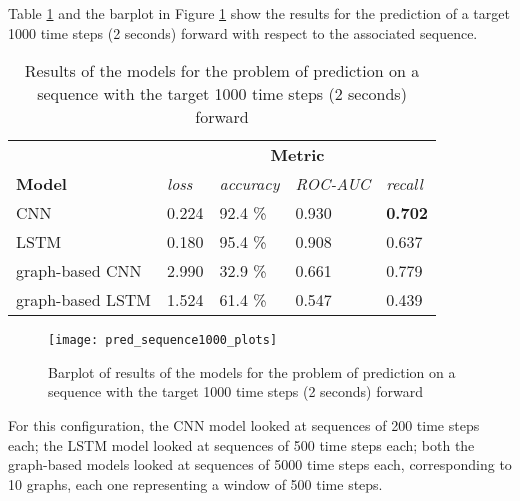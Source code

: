 Table \ref{tab:pred_sequence1000_results} and the barplot in Figure \ref{fig:pred_sequence1000_plots} show the results for the prediction of a target 1000 time steps (2 seconds) forward with respect to the associated sequence.
\begin{table}[htbp]
    \centering
    \begin{tabular}{lllll}
        \hline
                          & \multicolumn{4}{c}{\textbf{Metric}}                                    \\ \cline{2-5} 
        \textbf{Model}    & \textit{loss} & \textit{accuracy} & \textit{ROC-AUC} & \textit{recall} \\ \hline
        CNN               & 0.224         & 92.4 \%           & 0.930            & \textbf{0.702}  \\
        LSTM              & 0.180         & 95.4 \%           & 0.908            & 0.637           \\
        graph-based CNN   & 2.990         & 32.9 \%           & 0.661            & 0.779           \\
        graph-based LSTM  & 1.524         & 61.4 \%           & 0.547            & 0.439           \\\hline
    \end{tabular}
    \caption{Results of the models for the problem of prediction on a sequence with the target 1000 time steps (2 seconds) forward}
    \label{tab:pred_sequence1000_results}
\end{table}

\begin{figure}[htbp]
    \centering
    \texttt{[image: pred\_sequence1000\_plots]}
    \caption{Barplot of results of the models for the problem of prediction on a sequence with the target 1000 time steps (2 seconds) forward}
    \label{fig:pred_sequence1000_plots}
\end{figure}

For this configuration, the CNN model looked at sequences of 200 time steps each; the LSTM model looked at sequences of 500 time steps each; both the graph-based models looked at sequences of 5000 time steps each, corresponding to 10 graphs, each one representing a window of 500 time steps.

